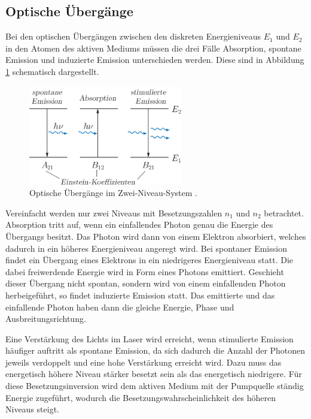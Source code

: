 \subsection*{Optische Übergänge}
Bei den optischen Übergängen zwischen den diskreten Energieniveaus $E_1$ und $E_2$ in den Atomen des aktiven Mediums
müssen die drei Fälle Absorption, spontane Emission und induzierte Emission unterschieden werden. Diese sind in 
Abbildung \ref{fig:tfig1} schematisch dargestellt.
\FloatBarrier
    \begin{figure}[h]
    \centering
    \includegraphics[width=0.6\textwidth]{optisch.png}
    \caption{Optische Übergänge im Zwei-Niveau-System \cite{quelle05}.}
    \label{fig:tfig1}
    \end{figure}
\FloatBarrier
\noindent
Vereinfacht werden nur zwei Niveaus mit Besetzungszahlen $n_1$ und $n_2$ betrachtet. 
Absorption tritt auf, wenn ein einfallendes Photon genau die Energie des Übergangs besitzt. Das Photon wird dann von einem
Elektron absorbiert, welches dadurch in ein höheres Energieniveau angeregt wird.
Bei spontaner Emission findet ein Übergang eines Elektrons in ein niedrigeres Energieniveau statt. Die dabei freiwerdende
Energie wird in Form eines Photons emittiert. Geschieht dieser Übergang nicht spontan, sondern wird von einem einfallenden 
Photon herbeigeführt, so findet induzierte Emission statt. Das emittierte und das einfallende Photon haben dann die gleiche
Energie, Phase und Ausbreitungsrichtung.

Eine Verstärkung des Lichts im Laser wird erreicht, wenn stimulierte Emission häufiger auftritt als spontane Emission, 
da sich dadurch die Anzahl der Photonen jeweils verdoppelt und eine hohe Verstärkung erreicht wird. 
Dazu muss das energetisch höhere Niveau stärker besetzt sein als das energetisch niedrigere. Für diese
Besetzungsinversion wird dem aktiven Medium mit der Pumpquelle ständig Energie zugeführt, wodurch die Besetzungswahrscheinlichkeit
des höheren Niveaus steigt. 

